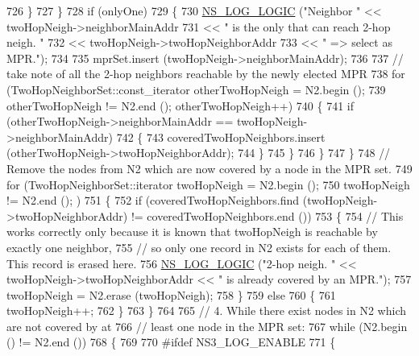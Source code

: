 \begin{DoxyCode}
726             \}
727         \}
728       \textcolor{keywordflow}{if} (onlyOne)
729         \{
730           \hyperlink{group__logging_ga88acd260151caf2db9c0fc84997f45ce}{NS\_LOG\_LOGIC} (\textcolor{stringliteral}{"Neighbor "} << twoHopNeigh->neighborMainAddr
731                                     << \textcolor{stringliteral}{" is the only that can reach 2-hop neigh. "}
732                                     << twoHopNeigh->twoHopNeighborAddr
733                                     << \textcolor{stringliteral}{" => select as MPR."});
734 
735           mprSet.insert (twoHopNeigh->neighborMainAddr);
736 
737           \textcolor{comment}{// take note of all the 2-hop neighbors reachable by the newly elected MPR}
738           \textcolor{keywordflow}{for} (TwoHopNeighborSet::const\_iterator otherTwoHopNeigh = N2.begin ();
739                otherTwoHopNeigh != N2.end (); otherTwoHopNeigh++)
740             \{
741               \textcolor{keywordflow}{if} (otherTwoHopNeigh->neighborMainAddr == twoHopNeigh->neighborMainAddr)
742                 \{
743                   coveredTwoHopNeighbors.insert (otherTwoHopNeigh->twoHopNeighborAddr);
744                 \}
745             \}
746         \}
747     \}
748   \textcolor{comment}{// Remove the nodes from N2 which are now covered by a node in the MPR set.}
749   \textcolor{keywordflow}{for} (TwoHopNeighborSet::iterator twoHopNeigh = N2.begin ();
750        twoHopNeigh != N2.end (); )
751     \{
752       \textcolor{keywordflow}{if} (coveredTwoHopNeighbors.find (twoHopNeigh->twoHopNeighborAddr) != coveredTwoHopNeighbors.end ())
753         \{
754           \textcolor{comment}{// This works correctly only because it is known that twoHopNeigh is reachable by exactly one
       neighbor,}
755           \textcolor{comment}{// so only one record in N2 exists for each of them. This record is erased here.}
756           \hyperlink{group__logging_ga88acd260151caf2db9c0fc84997f45ce}{NS\_LOG\_LOGIC} (\textcolor{stringliteral}{"2-hop neigh. "} << twoHopNeigh->twoHopNeighborAddr << \textcolor{stringliteral}{" is already
       covered by an MPR."});
757           twoHopNeigh = N2.erase (twoHopNeigh);
758         \}
759       \textcolor{keywordflow}{else}
760         \{
761           twoHopNeigh++;
762         \}
763     \}
764 
765   \textcolor{comment}{// 4. While there exist nodes in N2 which are not covered by at}
766   \textcolor{comment}{// least one node in the MPR set:}
767   \textcolor{keywordflow}{while} (N2.begin () != N2.end ())
768     \{
769 
770 \textcolor{preprocessor}{#ifdef NS3\_LOG\_ENABLE}
771       \{

\end{DoxyCode}
